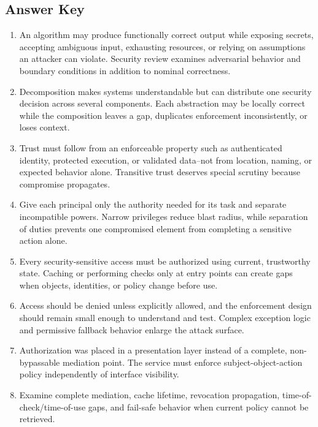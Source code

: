 \documentclass[11pt,letterpaper]{article}
\begin{document}
\subsection*{Answer Key}
\begin{enumerate}
\item An algorithm may produce functionally correct output while exposing secrets, accepting ambiguous input, exhausting resources, or relying on assumptions an attacker can violate. Security review examines adversarial behavior and boundary conditions in addition to nominal correctness.
\item Decomposition makes systems understandable but can distribute one security decision across several components. Each abstraction may be locally correct while the composition leaves a gap, duplicates enforcement inconsistently, or loses context.
\item Trust must follow from an enforceable property such as authenticated identity, protected execution, or validated data--not from location, naming, or expected behavior alone. Transitive trust deserves special scrutiny because compromise propagates.
\item Give each principal only the authority needed for its task and separate incompatible powers. Narrow privileges reduce blast radius, while separation of duties prevents one compromised element from completing a sensitive action alone.
\item Every security-sensitive access must be authorized using current, trustworthy state. Caching or performing checks only at entry points can create gaps when objects, identities, or policy change before use.
\item Access should be denied unless explicitly allowed, and the enforcement design should remain small enough to understand and test. Complex exception logic and permissive fallback behavior enlarge the attack surface.
\item Authorization was placed in a presentation layer instead of a complete, non-bypassable mediation point. The service must enforce subject-object-action policy independently of interface visibility.
\item Examine complete mediation, cache lifetime, revocation propagation, time-of-check/time-of-use gaps, and fail-safe behavior when current policy cannot be retrieved.
\end{enumerate}
\end{document}
